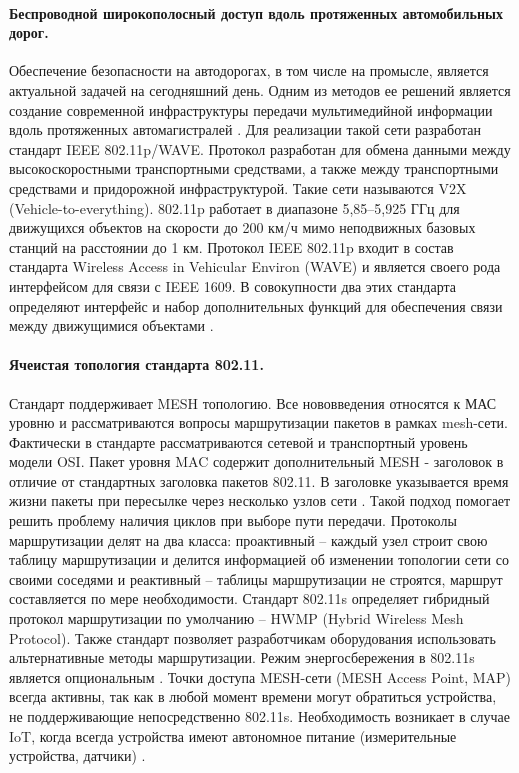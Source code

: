 \paragraph{Беспроводной широкополосный доступ вдоль протяженных автомобильных дорог.}
Обеспечение безопасности на автодорогах, в том числе на промысле, является  актуальной задачей на сегодняшний день. Одним из методов ее решений является создание современной инфраструктуры передачи мультимедийной информации вдоль протяженных автомагистралей \cite{Vish2015}. Для реализации такой сети разработан стандарт IEEE 802.11p/WAVE. Протокол разработан для обмена данными между высокоскоростными транспортными средствами, а также между транспортными средствами и придорожной инфраструктурой. Такие сети называются V2X (Vehicle-to-everything). 802.11p работает в диапазоне 5,85–5,925 ГГц для движущихся объектов на скорости до 200 км/ч мимо неподвижных базовых станций на расстоянии до 1 км. Протокол IEEE 802.11p входит в состав стандарта Wireless Access in Vehicular Environ (WAVE) и является своего рода интерфейсом для связи с IEEE 1609. В совокупности два этих стандарта определяют интерфейс и набор дополнительных функций для обеспечения связи между движущимися объектами \cite{IEEE802.11p}.

\paragraph{Ячеистая топология стандарта 802.11.} Стандарт поддерживает MESH топологию. Все нововведения относятся к МАС уровню и рассматриваются вопросы маршрутизации пакетов в рамках mesh-сети. Фактически в стандарте рассматриваются сетевой и транспортный уровень модели OSI. Пакет уровня MAC содержит дополнительный MESH - заголовок в отличие от стандартных заголовка пакетов 802.11. В заголовке указывается время жизни пакеты при пересылке через несколько узлов сети \cite{Vishnevsky2009}. Такой подход помогает решить проблему наличия циклов при выборе пути передачи. Протоколы маршрутизации делят на два класса: проактивный -- каждый узел строит свою таблицу маршрутизации и делится информацией об изменении топологии сети со своими соседями и реактивный --  таблицы маршрутизации не строятся, маршрут составляется по мере необходимости. Стандарт 802.11s определяет гибридный протокол маршрутизации по умолчанию -- HWMP (Hybrid Wireless Mesh Protocol). Также стандарт позволяет разработчикам оборудования использовать альтернативные методы маршрутизации. Режим энергосбережения в 802.11s является опциональным \cite{802.11WG-WirelessLANWorkingGroup2020}. Точки доступа MESH-сети (MESH Access Point, MAP) всегда активны, так как в любой момент времени могут обратиться устройства, не поддерживающие непосредственно 802.11s. Необходимость возникает в случае IoT, когда всегда устройства имеют автономное питание (измерительные устройства, датчики) \cite{Vishnevsky2009}.




